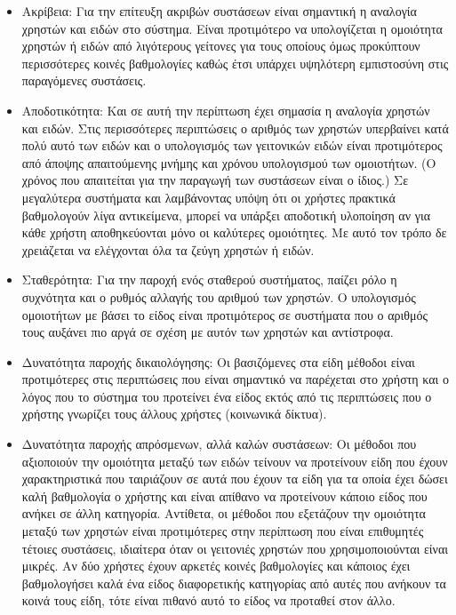 \begin{itemize}
 \item Ακρίβεια: Για την επίτευξη ακριβών συστάσεων είναι σημαντική η αναλογία χρηστών και ειδών στο σύστημα. Είναι προτιμότερο να υπολογίζεται η ομοιότητα χρηστών ή ειδών από λιγότερους γείτονες για τους οποίους όμως προκύπτουν περισσότερες κοινές βαθμολογίες καθώς έτσι υπάρχει υψηλότερη εμπιστοσύνη στις παραγόμενες συστάσεις.
 \item Αποδοτικότητα: Και σε αυτή την περίπτωση έχει σημασία η αναλογία χρηστών και ειδών. Στις περισσότερες περιπτώσεις ο αριθμός των χρηστών υπερβαίνει κατά πολύ αυτό των ειδών και ο υπολογισμός των γειτονικών ειδών είναι προτιμότερος από άποψης απαιτούμενης μνήμης και χρόνου υπολογισμού των ομοιοτήτων. (Ο χρόνος που απαιτείται για την παραγωγή των συστάσεων είναι ο ίδιος.) Σε μεγαλύτερα συστήματα και λαμβάνοντας υπόψη ότι οι χρήστες πρακτικά βαθμολογούν λίγα αντικείμενα, μπορεί να υπάρξει αποδοτική υλοποίηση αν για κάθε χρήστη αποθηκεύονται μόνο οι καλύτερες ομοιότητες. Με αυτό τον τρόπο δε χρειάζεται να ελέγχονται όλα τα ζεύγη χρηστών ή ειδών.
 \item Σταθερότητα: Για την παροχή ενός σταθερού συστήματος, παίζει ρόλο η συχνότητα και ο ρυθμός αλλαγής του αριθμού των χρηστών. Ο υπολογισμός ομοιοτήτων με βάσει το είδος είναι προτιμότερος σε συστήματα που ο αριθμός τους αυξάνει πιο αργά σε σχέση με αυτόν των χρηστών και αντίστροφα. 
 \item Δυνατότητα παροχής δικαιολόγησης: Οι βασιζόμενες στα είδη μέθοδοι είναι προτιμότερες στις περιπτώσεις που είναι σημαντικό να παρέχεται στο χρήστη και ο λόγος που το σύστημα του προτείνει ένα είδος εκτός από τις περιπτώσεις που ο χρήστης γνωρίζει τους άλλους χρήστες (κοινωνικά δίκτυα). 
 \item Δυνατότητα παροχής απρόσμενων, αλλά καλών συστάσεων: Οι μέθοδοι που αξιοποιούν την ομοιότητα μεταξύ των ειδών τείνουν να προτείνουν είδη που έχουν χαρακτηριστικά που ταιριάζουν σε αυτά που έχουν τα είδη για τα οποία έχει δώσει καλή βαθμολογία ο χρήστης και είναι απίθανο να προτεί\-νουν κάποιο είδος που ανήκει σε άλλη κατηγορία. Αντίθετα,
 οι μέθοδοι που εξετάζουν την ομοιότητα μεταξύ των χρηστών είναι προτιμότερες στην περίπτωση που είναι επιθυμητές τέτοιες συστάσεις, ιδιαίτερα όταν οι γειτονιές χρηστών που χρησιμοποιούνται είναι μικρές. Αν δύο χρήστες έχουν αρκετές κοινές βαθμολογίες και κάποιος έχει βαθμολογήσει καλά ένα είδος διαφορετικής κατηγορίας από αυτές που ανήκουν τα κοινά τους είδη, τότε είναι πιθανό αυτό το είδος να προταθεί στον άλλο.
\end{itemize}\par
